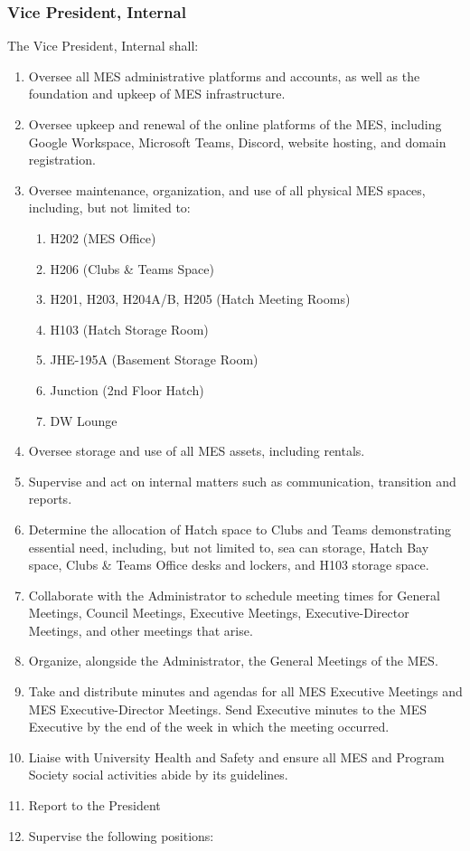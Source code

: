 \subsubsection{Vice President,
 Internal}
\label{vice-president-internal}
The Vice President, Internal shall:

\begin{enumerate}
 \item
  Oversee all MES administrative platforms and accounts, as well as the foundation and upkeep of MES infrastructure.
 \item
  Oversee upkeep and renewal of the online platforms of the MES, including Google Workspace, Microsoft Teams, Discord, website hosting, and domain registration.
 \item
  Oversee maintenance, organization, and use of all physical MES spaces, including, but not limited to:

  \begin{enumerate}
   \item
    H202 (MES Office)
   \item
    H206 (Clubs \& Teams Space)
   \item
    H201, H203, H204A/B, H205 (Hatch Meeting Rooms)
   \item
    H103 (Hatch Storage Room)
   \item
    JHE-195A (Basement Storage Room)
   \item
    Junction (2nd Floor Hatch)
   \item
    DW Lounge
  \end{enumerate}
 \item
  Oversee storage and use of all MES assets, including rentals.
 \item
  Supervise and act on internal matters such as communication, transition and reports.
 \item
  Determine the allocation of Hatch space to Clubs and Teams demonstrating essential need, including, but not limited to, sea can storage, Hatch Bay space, Clubs \& Teams Office desks and lockers, and H103 storage space.
 \item
  Collaborate with the Administrator to schedule meeting times for General Meetings, Council Meetings, Executive Meetings, Executive-Director Meetings, and other meetings that arise.
 \item
  Organize, alongside the Administrator, the General Meetings of the MES.
 \item
  Take and distribute minutes and agendas for all MES Executive Meetings and MES Executive-Director Meetings. Send Executive minutes to the MES Executive by the end of the week in which the meeting occurred.
 \item
  Liaise with University Health and Safety and ensure all MES and Program Society social activities abide by its guidelines.
 \item
  Report to the President
 \item
  Supervise the following positions:


\end{enumerate}
